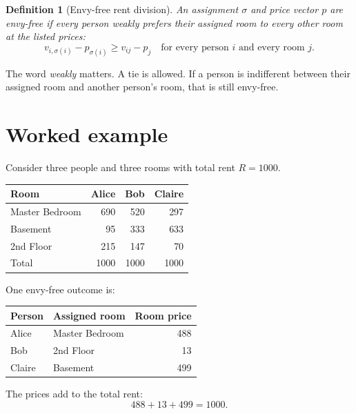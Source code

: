 \documentclass[11pt]{article}
\newtheorem{definition}{Definition}
\begin{document}
\begin{definition}[Envy-free rent division]
An assignment $\sigma$ and price vector $p$ are \emph{envy-free} if every person weakly prefers their assigned room to every other room at the listed prices:
\begin{equation}
    v_{i,\sigma(i)}-p_{\sigma(i)}\geq v_{ij}-p_j
    \quad \text{for every person }i\text{ and every room }j.
    \label{eq:envyfree}
\end{equation}
\end{definition}

The word \emph{weakly} matters. A tie is allowed. If a person is indifferent between their assigned room and another person's room, that is still envy-free.

\section{Worked example}

Consider three people and three rooms with total rent $R=1000$.

\begin{center}
\begin{tabular}{lrrr}
\toprule
\textbf{Room} & \textbf{Alice} & \textbf{Bob} & \textbf{Claire} \\
\midrule
Master Bedroom & 690 & 520 & 297 \\
Basement       &  95 & 333 & 633 \\
2nd Floor      & 215 & 147 &  70 \\
\midrule
Total          & 1000 & 1000 & 1000 \\
\bottomrule
\end{tabular}
\end{center}

One envy-free outcome is:

\begin{center}
\begin{tabular}{llr}
\toprule
\textbf{Person} & \textbf{Assigned room} & \textbf{Room price} \\
\midrule
Alice  & Master Bedroom & 488 \\
Bob    & 2nd Floor      &  13 \\
Claire & Basement       & 499 \\
\bottomrule
\end{tabular}
\end{center}

The prices add to the total rent:
\[
    488+13+499=1000.
\]
\end{document}
